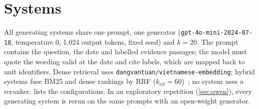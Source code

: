 \documentclass[conference]{IEEEtran}
\begin{document}
\section{Systems}
\label{sec:systems}

All generating systems share one prompt, one generator (\texttt{gpt-4o-mini-2024-07-18}, temperature 0, 1{,}024 output tokens, fixed seed) and $k=20$. The prompt contains the question, the date and labelled evidence passages; the model must quote the wording valid at the date and cite labels, which are mapped back to unit identifiers. Dense retrieval uses \texttt{dangvantuan/vietnamese-embedding}; hybrid systems fuse BM25 and dense rankings by RRF ($k_{\mathrm{rrf}}=60$)~\cite{cormack2009rrf}; no system uses a reranker.  lists the configurations. In an exploratory repetition (\cref{sec:qwen}), every generating system is rerun on the same prompts with an open-weight generator.
\end{document}
